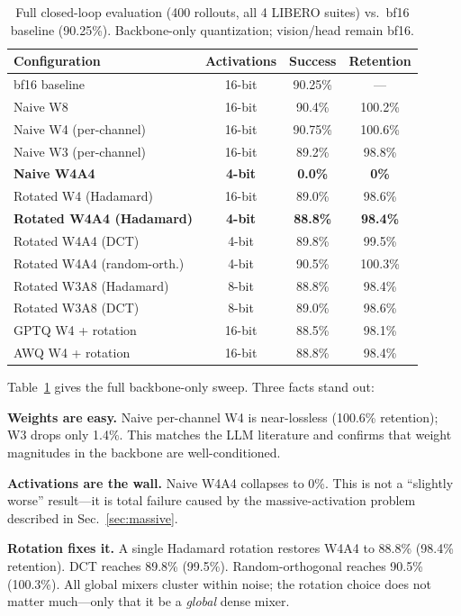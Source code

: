 \documentclass[conference]{IEEEtran}
\begin{document}
\begin{table}[t]\centering\small
\caption{Full closed-loop evaluation (400 rollouts, all 4 LIBERO suites) vs.\ bf16
baseline (90.25\%). Backbone-only quantization; vision/head remain bf16.}
\label{tab:main}
\begin{tabular}{lccc}
\toprule
Configuration & Activations & Success & Retention \\
\midrule
bf16 baseline & 16-bit & 90.25\% & --- \\
\midrule
Naive W8 & 16-bit & 90.4\% & 100.2\% \\
Naive W4 (per-channel) & 16-bit & 90.75\% & 100.6\% \\
Naive W3 (per-channel) & 16-bit & 89.2\% & 98.8\% \\
\textbf{Naive W4A4} & \textbf{4-bit} & \textbf{0.0\%} & \textbf{0\%} \\
\midrule
Rotated W4 (Hadamard) & 16-bit & 89.0\% & 98.6\% \\
\textbf{Rotated W4A4 (Hadamard)} & \textbf{4-bit} & \textbf{88.8\%} & \textbf{98.4\%} \\
Rotated W4A4 (DCT) & 4-bit & 89.8\% & 99.5\% \\
Rotated W4A4 (random-orth.) & 4-bit & 90.5\% & 100.3\% \\
Rotated W3A8 (Hadamard) & 8-bit & 88.8\% & 98.4\% \\
Rotated W3A8 (DCT) & 8-bit & 89.0\% & 98.6\% \\
GPTQ W4 + rotation & 16-bit & 88.5\% & 98.1\% \\
AWQ W4 + rotation & 16-bit & 88.8\% & 98.4\% \\
\bottomrule
\end{tabular}
\end{table}

Table~\ref{tab:main} gives the full backbone-only sweep. Three facts stand out:

\textbf{Weights are easy.} Naive per-channel W4 is near-lossless (100.6\% retention);
W3 drops only 1.4\%. This matches the LLM literature and confirms that weight magnitudes in
the backbone are well-conditioned.

\textbf{Activations are the wall.} Naive W4A4 collapses to 0\%. This is not a
``slightly worse'' result---it is total failure caused by the massive-activation problem
described in Sec.~\ref{sec:massive}.

\textbf{Rotation fixes it.} A single Hadamard rotation restores W4A4 to 88.8\% (98.4\%
retention). DCT reaches 89.8\% (99.5\%). Random-orthogonal reaches 90.5\% (100.3\%).
All global mixers cluster within noise; the rotation choice does not matter much---only that
it be a \emph{global} dense mixer.
\end{document}
